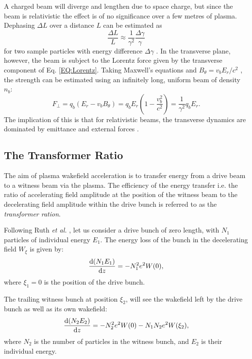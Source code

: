 A charged beam will diverge and lengthen due to space charge, but since the beam is relativistic the effect is of no significance over a few metres of plasma. Dephasing $\Delta L$ over a distance $L$ can be estimated as
\begin{equation}
    \frac{\Delta L}{L} \approx \frac{1}{\gamma^{2}}\frac{\Delta\gamma}{\gamma} \label{EQ:DePhL}
\end{equation}
for two sample particles with energy difference $\Delta\gamma$ \cite{muggli:2017}. In the transverse plane, however, the beam is subject to the Lorentz force given by the transverse component of Eq. \ref{EQ:Lorentz}. Taking Maxwell's equations and $B_{\theta} = v_{b}E_{r}/c^{2}$ \cite{schindl:1999}, the strength can be estimated using an infinitely long, uniform beam of density $n_{b}$:
\begin{equation}
    F_{\perp} = q_{b}(E_{r} - v_{b}B_{\theta})
              = q_{b}E_{r}\left(1 - \frac{v_{b}^{2}}{c^{2}}\right)
              = \frac{1}{\gamma^2}q_{b}E_{r}. \label{EQ:DeFocR}
\end{equation}
The implication of this is that for relativistic beams, the transverse dynamics are dominated by emittance and external forces \cite{muggli:2017}.

\subsection{The Transformer Ratio}
\label{Int:BPI:TRat}

The aim of plasma wakefield acceleration is to transfer energy from a drive beam to a witness beam via the plasma. The efficiency of the energy transfer \dash i.e. the ratio of accelerating field amplitude at the position of the witness beam to the decelerating field amplitude within the drive bunch \dash is referred to as the \textit{transformer ration}.

Following Ruth \textit{et al.} \cite{ruth:1985}, let us consider a drive bunch of zero length, with $N_{1}$ particles of individual energy $E_{1}$. The energy loss of the bunch in the decelerating field $W_{\xi}$ is given by:
\begin{equation}
    \frac{\mathrm{d} (N_{1}E_{1})}{\mathrm{d} z} = - N_{1}^{2}e^{2}W(0), \label{EQ:TRat:Drive}
\end{equation}
where $\xi_{1} = 0$ is the position of the drive bunch.

The trailing witness bunch at position $\xi_{2}$, will see the wakefield left by the drive bunch as well as its own wakefield:
\begin{equation}
    \frac{\mathrm{d} (N_{2}E_{2})}{\mathrm{d} z} = - N_{2}^{2}e^{2}W(0) - N_{1}N_{2}e^{2}W(\xi_{2}), \label{EQ:TRat:Witness}
\end{equation}
where $N_{2}$ is the number of particles in the witness bunch, and $E_{2}$ is their individual energy.

